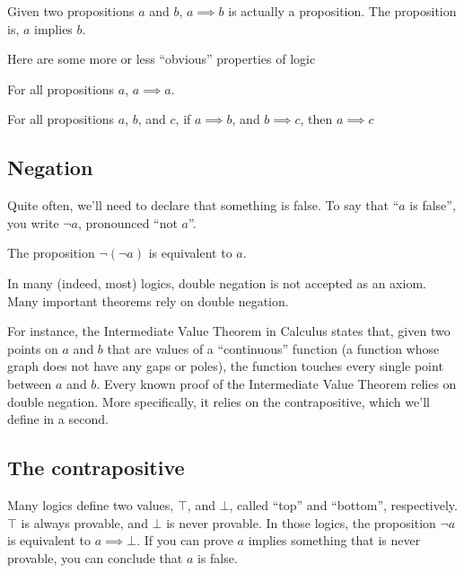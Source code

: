 \begin{remark}
  Given two propositions $a$ and $b$, $a \implies b$ is actually a
  proposition. The proposition is, $a$ implies $b$.
\end{remark}

Here are some more or less ``obvious'' properties of logic

\begin{axiom}
  \label{ax:props-refl}
  For all propositions $a$, $a \implies a$.
\end{axiom}

\begin{axiom}
  \label{ax:props-trans}
  For all propositions $a$, $b$, and $c$, if $a \implies b$, and $b
  \implies c$, then $a \implies c$
\end{axiom}

\subsection{Negation}

Quite often, we'll need to declare that something is false. To say
that ``$a$ is false'', you write $\lnot a$, pronounced ``not $a$''.

\begin{axiom}
  The proposition $\lnot(\lnot a)$ is equivalent to $a$.
\end{axiom}

\begin{remark}
  In many (indeed, most) logics, double negation is not accepted as an
  axiom. Many important theorems rely on double negation.

  For instance, the Intermediate Value Theorem in Calculus states
  that, given two points on $a$ and $b$ that are values of a
  ``continuous'' function (a function whose graph does not have any
  gaps or poles), the function touches every single point between $a$
  and $b$. Every known proof of the Intermediate Value Theorem relies
  on double negation. More specifically, it relies on the
  contrapositive, which we'll define in a second.
\end{remark}

\subsection{The contrapositive}

Many logics define two values, $\top$, and $\bot$, called ``top'' and
``bottom'', respectively. $\top$ is always provable, and $\bot$ is
never provable. In those logics, the proposition $\lnot a$ is
equivalent to $a \implies \bot$. If you can prove $a$ implies
something that is never provable, you can conclude that $a$ is false.

